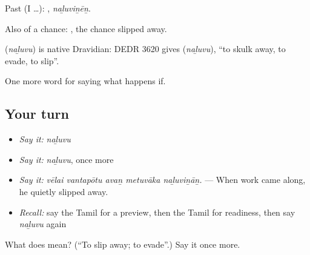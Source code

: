 Past (I …): , \emph{naḻuviṉēṉ}.

Also of a chance:  , the chance slipped away.

\begin{cousinweb}
\textbf{} (\emph{naḻuvu}) is native Dravidian: DEDR 3620 gives  (\emph{naḻuvu}), \textquotedblleft{}to skulk away, to evade, to slip\textquotedblright{}.
\end{cousinweb}

\begin{grammarlens}[title={What you've built}]
One more word for saying what happens if.
\end{grammarlens}

\subsection*{Your turn}
\begin{itemize}
\raggedright
  \item \emph{Say it:} \emph{naḻuvu}
  \item \emph{Say it:} \emph{naḻuvu}, once more
  \item \emph{Say it:} \emph{vēlai vantapōtu avaṉ metuvāka naḻuviṉāṉ.} — When work came along, he quietly slipped away.
  \item \emph{Recall:} say the Tamil for a preview, then the Tamil for readiness, then say \emph{naḻuvu} again
\end{itemize}

\begin{tcolorbox}[breakable,colback=teal!4,colframe=teal!35!black,title={Before you move on}]
What does  mean? (\textquotedblleft{}To slip away; to evade\textquotedblright{}.) Say it once more.
\end{tcolorbox}
